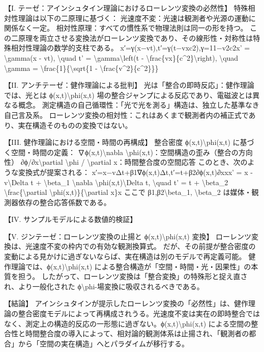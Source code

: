 \documentclass{article}
\begin{document}
【I. テーゼ：アインシュタイン理論におけるローレンツ変換の必然性】
特殊相対性理論は以下の二原理に基づく：
光速度不変：光速は観測者や光源の運動に関係なく一定。
相対性原理：すべての慣性系で物理法則は同一の形を持つ。
この二原理を両立させる変換法がローレンツ変換であり、その線形性・対称性は特殊相対性理論の数学的支柱である。
x′=γ(x−vt),t′=γ(t−vxc2),γ=11−v2c2x' = \textbackslash{}gamma(x - vt), \textbackslash{}quad t' = \textbackslash{}gamma\textbackslash{}left(t - \textbackslash{}frac\{vx\}\{c\textasciicircum{}2\}\textbackslash{}right), \textbackslash{}quad \textbackslash{}gamma = \textbackslash{}frac\{1\}\{\textbackslash{}sqrt\{1 - \textbackslash{}frac\{v\textasciicircum{}2\}\{c\textasciicircum{}2\}\}\} 

【II. アンチテーゼ：健作理論による批判】
光は「整合の即時反応」：健作理論では、光とは ϕ(x,t)\textbackslash{}phi(x,t) 場の整合ジャンプによる反応であり、電磁波とは異なる概念。
測定構造の自己循環性：「光で光を測る」構造は、独立した基準なき自己言及系。
ローレンツ変換の相対性：これはあくまで観測者内の補正式であり、実在構造そのものの変換ではない。

【III. 健作理論における空間・時間の再構成】
整合密度 ϕ(x,t)\textbackslash{}phi(x,t) に基づく空間・時間の定義：
∇ϕ(x,t)\textbackslash{}nabla \textbackslash{}phi(x,t)：空間構造の歪み（整合の方向性）
∂ϕ/∂x\textbackslash{}partial \textbackslash{}phi / \textbackslash{}partial x：時間整合度の空間応答
このとき、次のような変換式が提案される：
x′=x−vΔt+β1∇ϕ(x,t)Δt,t′=t+β2∂ϕ(x,t)∂xxx' = x - v\textbackslash{}Delta t + \textbackslash{}beta\_1 \textbackslash{}nabla \textbackslash{}phi(x,t)\textbackslash{}Delta t, \textbackslash{}quad t' = t + \textbackslash{}beta\_2 \textbackslash{}frac\{\textbackslash{}partial \textbackslash{}phi(x,t)\}\{\textbackslash{}partial x\}x 
ここで β1,β2\textbackslash{}beta\_1, \textbackslash{}beta\_2 は媒体・観測器依存の整合応答係数である。

【IV. サンプルモデルによる数値的検証】

【V. ジンテーゼ：ローレンツ変換の止揚と ϕ(x,t)\textbackslash{}phi(x,t) 変換】
ローレンツ変換は、光速度不変の枠内での有効な観測換算式。
だが、その前提が整合密度の変動による見かけに過ぎないならば、実在構造は別のモデルで再定義可能。
健作理論では、ϕ(x,t)\textbackslash{}phi(x,t) による整合構造が「空間・時間・光・因果性」の本質を担う。
したがって、ローレンツ変換は「整合変換」の特殊形と捉え直され、より一般化された ϕ\textbackslash{}phi-場変換に吸収されるべきである。

【結論】
アインシュタインが提示したローレンツ変換の「必然性」は、健作理論の整合密度モデルによって再構成されうる。光速度不変は実在の即時整合ではなく、測定上の構造的反応の一形態に過ぎない。ϕ(x,t)\textbackslash{}phi(x,t) による空間の整合性と時間整合度の導入によって、相対論的観測体系は止揚され、「観測者の都合」から「空間の実在構造」へとパラダイムが移行する。
\end{document}
